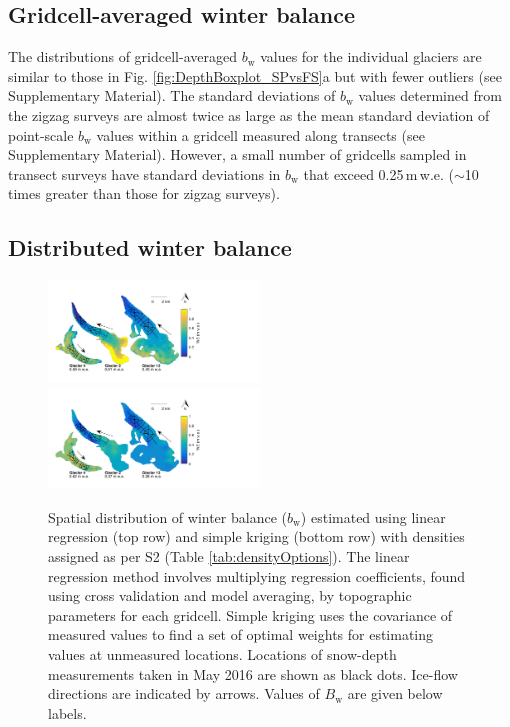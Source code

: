 \documentclass[twocolumn, letterpaper]{igs}
\begin{document}
\subsection{Gridcell-averaged winter balance}

The distributions of gridcell-averaged $b_\mathrm{w}$ values for the individual glaciers are similar to those in Fig. \ref{fig:DepthBoxplot_SPvsFS}a but with fewer outliers (see Supplementary Material). The standard deviations of $b_\mathrm{w}$ values determined from the zigzag surveys are almost twice as large as the mean standard deviation of point-scale $b_\mathrm{w}$ values within a gridcell measured along transects (see Supplementary Material). However, a small number of gridcells sampled in transect surveys have standard deviations in $b_\mathrm{w}$ that exceed 0.25\,m\,w.e. ($\sim$10 times greater than those for zigzag surveys). 

\subsection{Distributed winter balance}

\begin{figure}
	\centering
	\includegraphics[width =0.5\textwidth]{LR_map.pdf}\\
    \includegraphics[width =0.5\textwidth]{SK_map.pdf}\\
	\caption{Spatial distribution of winter balance ($b_\mathrm{w}$) estimated using linear regression (top row) and simple kriging (bottom row) with densities assigned as per S2 (Table \ref{tab:densityOptions}). The linear regression method involves multiplying regression coefficients, found using cross validation and model averaging, by topographic parameters for each gridcell. Simple kriging uses the covariance of measured values to find a set of optimal weights for estimating values at unmeasured locations. Locations of snow-depth measurements taken in May 2016 are shown as black dots. Ice-flow directions are indicated by arrows. Values of $B_\mathrm{w}$ are given below labels.}
	\label{fig:LR_SK_map}
\end{figure}
\end{document}
